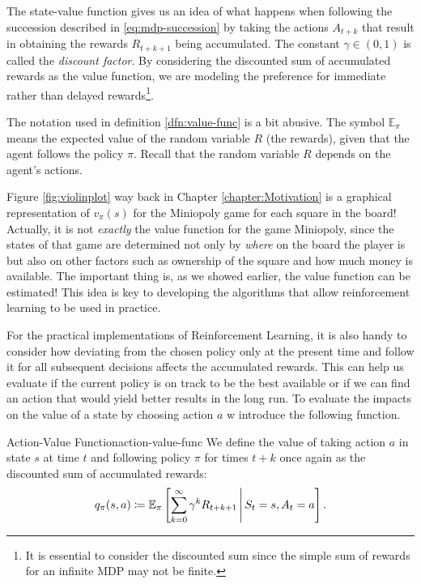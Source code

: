 The state-value function gives us an idea of what happens when following the
succession described in \eqref{eq:mdp-succession} by taking the actions
$A_{t+k}$ that result in obtaining the rewards $R_{t+k+1}$ being accumulated.
The constant $\gamma \in (0, 1)$ is called the \textit{discount factor}. By
considering the discounted sum of accumulated rewards as the value function, we
are modeling the preference for immediate rather than delayed
rewards\footnote{It is essential to consider the discounted sum since the simple
sum of rewards for an infinite MDP may not be finite.}. 

The notation used in definition \ref{dfn:value-func} is a bit abusive. The
symbol $\mathbb{E}_{\pi}$ means the expected value of the random variable $R$
(the rewards), given that the agent follows the policy $\pi$. Recall that the
random variable $R$ depends on the agent's actions.

Figure \ref{fig:violinplot} way back in Chapter \ref{chapter:Motivation} is
a graphical representation of $v_\pi (s)$ for the Miniopoly game for each square
in the board! Actually, it is not \textit{exactly} the value function for the
game Miniopoly, since the states of that game are determined not only by
\textit{where} on the board the player is but also on other factors such as
ownership of the square and how much money is available. The important thing is,
as we showed earlier, the value function can be estimated! This idea is key to
developing the algorithms that allow reinforcement learning to be used in
practice.

For the practical implementations of Reinforcement Learning, it is also handy to
consider how deviating from the chosen policy only at the present time and
follow it for all subsequent decisions affects the accumulated rewards. This can
help us evaluate if the current policy is on track to be the best available or
if we can find an action that would yield better results in the long run. To
evaluate the impacts on the value of a state by choosing action $a$ w introduce
the following function. 

\begin{dfn}{Action-Value Function}{action-value-func}
	We define the value of taking action $a$ in state $s$ at time $t$ and
	following policy $\pi$ for times $t+k$ once again as the discounted sum of
	accumulated rewards:
	\[
		q_\pi (s, a) \coloneqq \mathbb{E}_{\pi} \left[ \sum_{k=0}^{\infty} \gamma^{k} R_{t+k+1} \,\middle\vert\, S_t = s, A_t = a \right].
	\]
\end{dfn}

